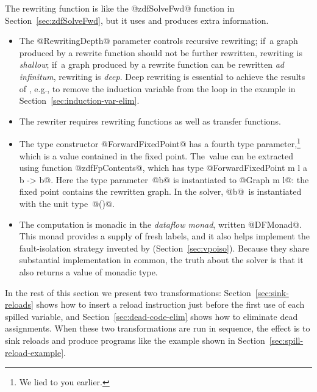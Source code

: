 \documentclass[blockstyle,preprint,nocopyrightspace]{sigplanconf}
\newcommand{\authornote}[1]{{\em #1}}
\def\authornote#1{\unskip\relax}
\newcommand{\simon}[1]{\authornote{SLPJ: #1}}
\newcommand{\john}[1]{\authornote{JD: #1}}
\newcommand\secref[1]{Section~\ref{sec:#1}}
\newcommand\seclabel[1]{\label{sec:#1}}
\begin{document}
The rewriting function is like the @zdfSolveFwd@ function in
\secref{zdfSolveFwd}, but it uses and produces extra
information.\seclabel{engine-truth} 
\begin{itemize}
\item
The @RewritingDepth@ parameter controls recursive rewriting;
if~a graph produced by a rewrite function should not be further rewritten,
rewriting is \emph{shallow};
if~a graph produced by a rewrite function can be rewritten \emph{ad
infinitum},\john{this phrasing evokes non-termination} rewriting is \emph{deep}.
Deep rewriting is essential to achieve the results of
\citet{lerner-grove-chambers:2002}, e.g., to remove the induction
variable from the loop in the example in \secref{induction-var-elim}.
\item
The rewriter requires rewriting functions as well as transfer
functions.
\item
The type constructor @ForwardFixedPoint@ has a fourth
type parameter,\footnote
{We lied to you earlier.}
which is a value contained in the fixed point.
The~value can be extracted using function @zdfFpContents@, which has
type @ForwardFixedPoint m l a b -> b@.
Here the type parameter~@b@ is instantiated to @Graph m l@: the fixed point
contains the rewritten graph.
In the solver, @b@~is instantiated with
the unit type~@()@. \simon{I'm afraid I do not understand this bullet
at all.}
\item
The computation is monadic in the \emph{dataflow monad}, written
@DFMonad@.
This monad provides a supply of fresh labels, and it
also helps implement the fault-isolation strategy invented by
\citet{whalley:isolation} (\secref{vpoiso}).
Because they share substantial implementation in common, the truth
about the solver is that it also returns a value of monadic type.
\end{itemize}

In the rest of this section we present two transformations:
\secref{sink-reloads} shows how to insert a reload instruction just
before the first use of each spilled variable, and
\secref{dead-code-elim} shows how to eliminate dead assignments.
When these two transformations are run in sequence, the effect is to
sink reloads and produce programs like the example shown in
\secref{spill-reload-example}. 
\end{document}
